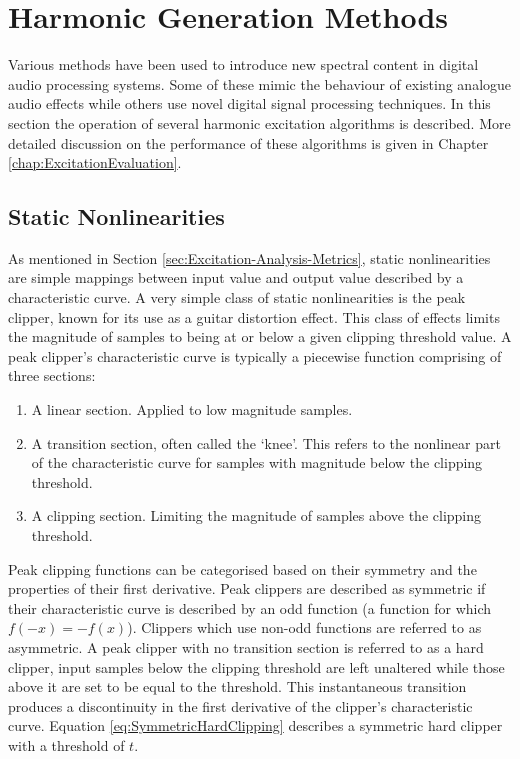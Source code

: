 \section{Harmonic Generation Methods}
\label{sec:Excitation-Methods}
	Various methods have been used to introduce new spectral content in digital audio processing systems.  Some of
	these mimic the behaviour of existing analogue audio effects while others use novel digital signal processing
	techniques. In this section the operation of several harmonic excitation algorithms is described. More detailed
	discussion on the performance of these algorithms is given in Chapter \ref{chap:ExcitationEvaluation}.

	\subsection{Static Nonlinearities}
	\label{sec:Excitation-Methods-Statics}
		As mentioned in Section \ref{sec:Excitation-Analysis-Metrics}, static nonlinearities are simple mappings
		between input value and output value described by a characteristic curve. A very simple class of static
		nonlinearities is the peak clipper, known for its use as a guitar distortion effect. This class of effects
		limits the magnitude of samples to being at or below a given clipping threshold value. A peak clipper's
		characteristic curve is typically a piecewise function comprising of three sections:

		\begin{enumerate}
			\item A linear section. Applied to low magnitude samples.
			\item A transition section, often called the `knee'. This refers to the nonlinear part of the
				characteristic curve for samples with magnitude below the clipping threshold.
			\item A clipping section. Limiting the magnitude of samples above the clipping threshold.
		\end{enumerate}
		
		Peak clipping functions can be categorised based on their symmetry and the properties of their first
		derivative. Peak clippers are described as symmetric if their characteristic curve is described by an odd
		function (a function for which $f(-x) = -f(x)$). Clippers which use non-odd functions are referred to as
		asymmetric. A peak clipper with no transition section is referred to as a hard clipper, input samples below
		the clipping threshold are left unaltered while those above it are set to be equal to the threshold. This
		instantaneous transition produces a discontinuity in the first derivative of the clipper's characteristic
		curve. Equation \ref{eq:SymmetricHardClipping} describes a symmetric hard clipper with a threshold of $t$.

